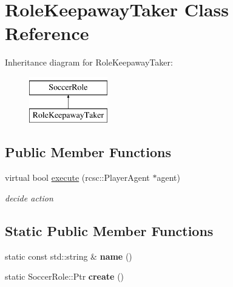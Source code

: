 \hypertarget{classRoleKeepawayTaker}{
\section{RoleKeepawayTaker Class Reference}
\label{classRoleKeepawayTaker}
}
Inheritance diagram for RoleKeepawayTaker:\begin{figure}[H]
\begin{center}
\leavevmode
\includegraphics[height=2.000000cm]{classRoleKeepawayTaker}
\end{center}
\end{figure}
\subsection*{Public Member Functions}
\begin{DoxyCompactItemize}
\item 
\hypertarget{classRoleKeepawayTaker_af3d02c88c2935f870d83d34ba5f36b8d}{
virtual bool \hyperlink{classRoleKeepawayTaker_af3d02c88c2935f870d83d34ba5f36b8d}{execute} (rcsc::PlayerAgent $\ast$agent)}
\label{classRoleKeepawayTaker_af3d02c88c2935f870d83d34ba5f36b8d}

\begin{DoxyCompactList}\small\item\em decide action \item\end{DoxyCompactList}\end{DoxyCompactItemize}
\subsection*{Static Public Member Functions}
\begin{DoxyCompactItemize}
\item 
\hypertarget{classRoleKeepawayTaker_a072cb985bac1f2553f8aa03a6c6f09f3}{
static const std::string \& {\bfseries name} ()}
\label{classRoleKeepawayTaker_a072cb985bac1f2553f8aa03a6c6f09f3}

\item 
\hypertarget{classRoleKeepawayTaker_ad9147621bf312bb9315c3a62aa47745f}{
static SoccerRole::Ptr {\bfseries create} ()}
\label{classRoleKeepawayTaker_ad9147621bf312bb9315c3a62aa47745f}

\end{DoxyCompactItemize}
